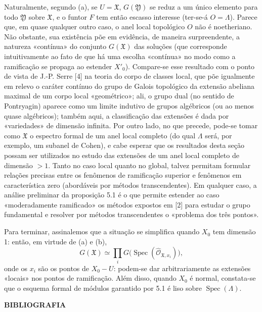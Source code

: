 Naturalmente, segundo (a), se $U=\mathfrak X$, $G(\mathfrak Y)$ se reduz a um
único elemento para todo $\mathfrak Y$ sobre $\mathfrak X$, e o funtor $F$
tem então escasso interesse (ter-se-á $O=\Lambda$). Parece que, em quase
qualquer outro caso, o anel local topológico $O$ não é noetheriano. Não
obstante, sua existência põe em evidência, de maneira surpreendente, a
natureza «contínua» do conjunto $G(\mathfrak X)$ das soluções (que
corresponde intuitivamente ao fato de que há uma escolha «contínua» no
modo como a ramificação se propaga ao estender $X'_0$). Compare-se esse
resultado com o ponto de vista de J.-P. Serre [4] na teoria do corpo de
classes local, que põe igualmente em relevo o caráter contínuo do grupo de
Galois topológico da extensão abeliana maximal de um corpo local
«geométrico»; ali, o grupo dual (no sentido de Pontryagin) aparece como um
limite indutivo de grupos algébricos (ou ao menos quase algébricos); também
aqui, a classificação das extensões é dada por «variedades» de
dimensão infinita. Por outro lado, no que precede, pode-se tomar como
$\mathfrak X$ o espectro formal de um anel local completo (do qual
$\Lambda$ será, por exemplo, um subanel de Cohen), e cabe esperar que os
resultados desta seção possam ser utilizados no estudo das extensões
de um anel local completo de dimensão $>1$. Tanto no caso local quanto no
global, talvez permitam formular relações precisas entre os fenômenos de
ramificação superior e fenômenos em característica zero (abordáveis por
métodos transcendentes). Em qualquer caso, a análise preliminar da
proposição 5.1 é o que permite estender ao caso «moderadamente ramificado»
os métodos expostos em [2] para estudar o grupo fundamental e resolver por
métodos transcendentes o «problema dos três pontos».

Para terminar, assinalemos que a situação se simplifica quando $X_0$ tem
dimensão 1: então, em virtude de (a) e (b),
\[
  G(\mathfrak X)\simeq
  \prod_iG\bigl(\operatorname{Spec}(\widehat{\mathcal O}_{\mathfrak X,x_i})\bigr),
\]
onde os $x_i$ são os pontos de $X_0-U$: podem-se dar arbitrariamente as
extensões «locais» nos pontos de ramificação. Além disso, quando $X_0$ é
normal, constata-se que o esquema formal de módulos garantido por 5.1 é
liso sobre $\operatorname{Spec}(\Lambda)$.

\begin{center}
  \textbf{BIBLIOGRAFIA}
\end{center}


